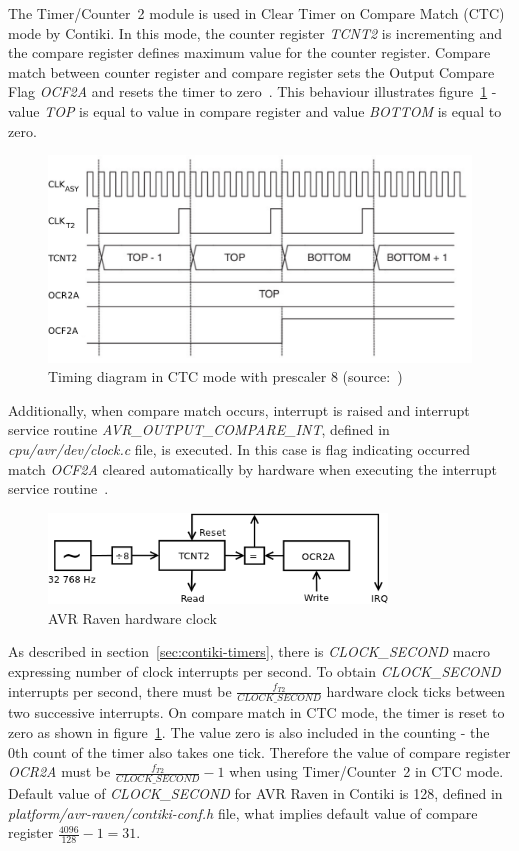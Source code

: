 The Timer/Counter~2 module is used in Clear Timer on Compare Match (CTC) mode by Contiki.
In this mode, the counter register {\it{TCNT2}} is incrementing
and the compare register defines maximum value for the counter register.
Compare match between counter register and compare register
sets the Output Compare Flag {\it{OCF2A}} and resets the timer to zero~\cite{avr-datasheet}.
This behaviour illustrates figure~\ref{fig:design-timing-diagram}
- value {\it{TOP}} is equal to value in compare register and value {\it{BOTTOM}} is equal to zero.

\begin{figure}
  \centering
  \includegraphics[width=12cm,keepaspectratio]{fig/timing-diagram.pdf}
  \caption{Timing diagram in CTC mode with prescaler 8 (source:~\cite{avr-datasheet})}
  \label{fig:design-timing-diagram}
\end{figure}

Additionally, when compare match occurs,
interrupt is raised and interrupt service routine {\it{AVR\_OUTPUT\_COMPARE\_INT}},
defined in {\it{cpu/avr/dev/clock.c}} file, is executed.
In this case is flag indicating occurred match {\it{OCF2A}}
cleared automatically by hardware when executing
the interrupt service routine~\cite{avr-datasheet}.

\begin{figure}
  \centering
  \includegraphics[width=9cm,keepaspectratio]{fig/avr-clock.png}
  \caption{AVR Raven hardware clock}
  \label{fig:avr-clock}
\end{figure}

As described in section~\ref{sec:contiki-timers}, there is
{\it{CLOCK\_SECOND}} macro expressing number of clock interrupts per second.
To obtain {\it{CLOCK\_SECOND}} interrupts per second, there must be
${\frac{f_{T2}}{CLOCK\_SECOND}}$ hardware clock ticks between two successive interrupts.
On compare match in CTC mode, the timer is reset to zero as
shown in figure~\ref{fig:design-timing-diagram}.
The value zero is also included in the counting - the 0th count of the timer also takes one tick.
Therefore the value of compare register {\it{OCR2A}} must be ${\frac{f_{T2}}{CLOCK\_SECOND}} - 1$
when using Timer/Counter~2 in CTC mode.
Default value of {\it{CLOCK\_SECOND}} for AVR Raven in Contiki is 128,
defined in {\it{platform/avr-raven/contiki-conf.h}} file,
what implies default value of compare register ${\frac{4096}{128}} - 1 = 31$.

